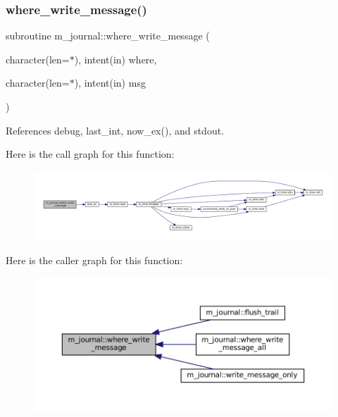 \subsubsection{\texorpdfstring{where\+\_\+write\+\_\+message()}{where\_write\_message()}}
{\footnotesize\ttfamily subroutine m\+\_\+journal\+::where\+\_\+write\+\_\+message (\begin{DoxyParamCaption}\item[{character(len=$\ast$), intent(in)}]{where,  }\item[{character(len=$\ast$), intent(in)}]{msg }\end{DoxyParamCaption})\hspace{0.3cm}{\ttfamily [private]}}



References debug, last\+\_\+int, now\+\_\+ex(), and stdout.

Here is the call graph for this function\+:\nopagebreak
\begin{figure}[H]
\begin{center}
\leavevmode
\includegraphics[width=350pt]{namespacem__journal_a21238c3fc7731703c75eb39233ab529e_cgraph}
\end{center}
\end{figure}
Here is the caller graph for this function\+:\nopagebreak
\begin{figure}[H]
\begin{center}
\leavevmode
\includegraphics[width=350pt]{namespacem__journal_a21238c3fc7731703c75eb39233ab529e_icgraph}
\end{center}
\end{figure}
\mbox{\label{namespacem__journal_a25d0f5da7f7e84e22ab0a583447412b1}} 
